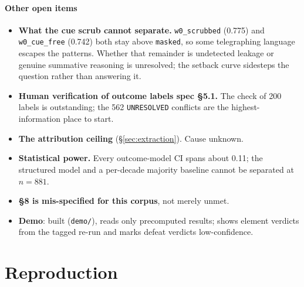 \documentclass[12pt,a4paper]{article}
\newcommand{\code}[1]{\texttt{\small #1}}
\newcommand{\spec}[1]{\textbf{spec §#1}}
\begin{document}
\paragraph{Other open items}
\begin{itemize}
\item \textbf{What the cue scrub cannot separate.} \code{w0\_scrubbed} (0.775) and
\code{w0\_cue\_free} (0.742) both stay above \code{masked}, so some telegraphing language escapes the
patterns. Whether that remainder is undetected leakage or genuine summative reasoning is unresolved;
the setback curve sidesteps the question rather than answering it.
\item \textbf{Human verification of outcome labels \spec{5.1}.} The check of 200 labels is
outstanding; the 562 \code{UNRESOLVED} conflicts are the highest-information place to start.
\item \textbf{The attribution ceiling} (§\ref{sec:extraction}). Cause unknown.
\item \textbf{Statistical power.} Every outcome-model CI spans about 0.11; the structured model and a
per-decade majority baseline cannot be separated at $n=881$.
\item \textbf{§8 is mis-specified for this corpus}, not merely unmet.
\item \textbf{Demo}: built (\code{demo/}), reads only precomputed results; shows element verdicts
from the tagged re-run and marks defeat verdicts low-confidence.
\end{itemize}

\section{Reproduction}\label{sec:repro}
\end{document}
